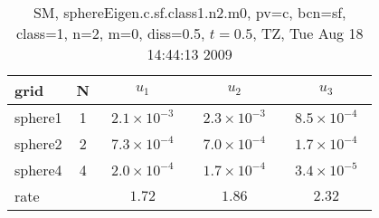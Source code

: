 \begin{table}[hbt]\tableFont %
\begin{center}
\begin{tabular}{|l|c|c|c|c|} \hline 
grid  & N &  $u_1$ & $u_2$ & $u_3$  \\ \hline 
             sphere1 &     1 & ~$2.1\times10^{ -3}$~ & ~$2.3\times10^{ -3}$~ & ~$8.5\times10^{ -4}$~  \\ \hline
             sphere2 &     2 & ~$7.3\times10^{ -4}$~ & ~$7.0\times10^{ -4}$~ & ~$1.7\times10^{ -4}$~  \\ \hline
             sphere4 &     4 & ~$2.0\times10^{ -4}$~ & ~$1.7\times10^{ -4}$~ & ~$3.4\times10^{ -5}$~  \\ \hline
    rate             &       &       $1.72$          &       $1.86$          &       $2.32$           \\ \hline
\end{tabular}
\caption{SM, sphereEigen.c.sf.class1.n2.m0, pv=c, bcn=sf, class=1, n=2, m=0, diss=0.5, $t=0.5$,  TZ, Tue Aug 18 14:44:13 2009}\label{table:sphereEigen.c.sf.class1.n2.m0}
\end{center}
\end{table}
